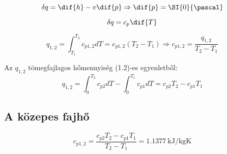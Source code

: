 \begin{equation}
	\delta{q}=\dif{h}-v\dif{p} 
	\Rightarrow
	\dif{p}=\SI{0}{\pascal} 
\end{equation}

\begin{equation*}
	\delta{q}=c_p \dif{T}
\end{equation*}

\begin{equation}
	q_{1,2} = \int_{T_1}^{T_2}c_{p1,2}dT 
	= 
	c_{p1,2}(T_2-T_1) 
	\Rightarrow 
	c_{p1,2} =\dfrac{q_{1,2}}{T_2-T_1} 
\end{equation}

\noindent
Az $q_{1,2}$ tömegfajlagos hőmennyiség (1.2)-es egyenletből:
\begin{equation}
	q_{1,2} = \int_{0}^{T_2}c_{p2}dT - \int_{0}^{T_1}c_{p1}dT
	= 
	c_{p2}T_2 - c_{p1}T_1
\end{equation}

\subsection*{A közepes fajhő}
\begin{equation}
	c_{p1,2} =\dfrac{c_{p2}T_2 - c_{p1}T_1}{T_2-T_1}
	=
	\SI{1,1377}{\kilo\joule\per\kilogram\kelvin}
\end{equation}



